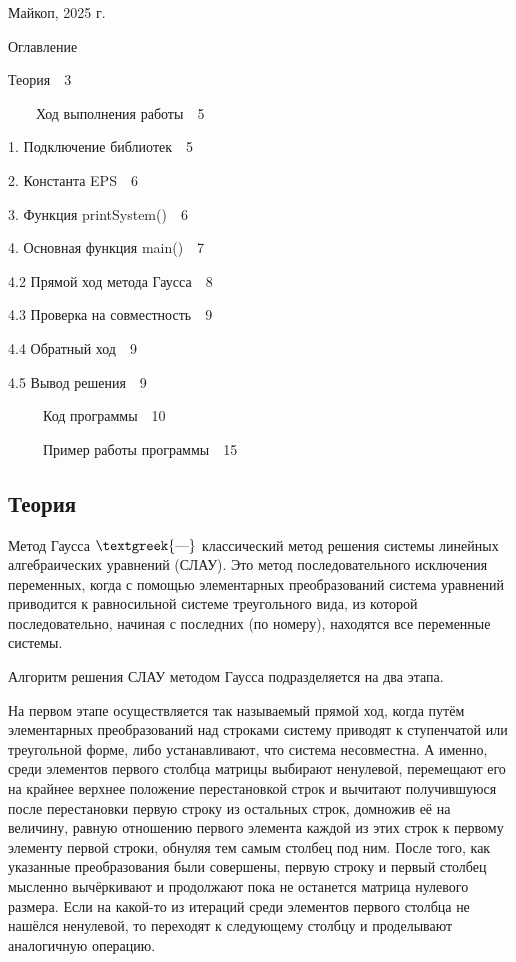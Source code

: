 \documentclass{article}
\begin{document}
\bigskip


\bigskip


\bigskip


\bigskip


\bigskip


\bigskip


\bigskip

Майкоп, 2025 г.

\clearpage
\bigskip

Оглавление

Теория\ \ 3

\ \ \ \ Ход выполнения работы\ \ 5

1. Подключение библиотек\ \ 5

2. Константа EPS\ \ 6

3. Функция printSystem()\ \ 6

4. Основная функция main()\ \ 7

4.2 Прямой ход метода Гаусса\ \ 8

4.3 Проверка на совместность\ \ 9

4.4 Обратный ход\ \ 9

4.5 Вывод решения\ \ 9

\ \ \ \ \ Код программы\ \ 10

\ \ \ \ \ Пример работы программы\ \ 15


\bigskip


\bigskip

\clearpage\subsection{Теория}
Метод Гаусса $\text{\textgreek{—}}$ классический метод решения системы линейных алгебраических уравнений (СЛАУ). Это
метод последовательного исключения переменных, когда с помощью элементарных преобразований система уравнений приводится
к равносильной системе треугольного вида, из которой последовательно, начиная с последних (по номеру), находятся все
переменные системы.

Алгоритм решения СЛАУ методом Гаусса подразделяется на два этапа.

На первом этапе осуществляется так называемый прямой ход, когда путём элементарных преобразований над строками систему
приводят к ступенчатой или треугольной форме, либо устанавливают, что система несовместна. А именно, среди элементов
первого столбца матрицы выбирают ненулевой, перемещают его на крайнее верхнее положение перестановкой строк и вычитают
получившуюся после перестановки первую строку из остальных строк, домножив её на величину, равную отношению первого
элемента каждой из этих строк к первому элементу первой строки, обнуляя тем самым столбец под ним. После того, как
указанные преобразования были совершены, первую строку и первый столбец мысленно вычёркивают и продолжают пока не
останется матрица нулевого размера. Если на какой-то из итераций среди элементов первого столбца не нашёлся ненулевой,
то переходят к следующему столбцу и проделывают аналогичную операцию.
\end{document}
